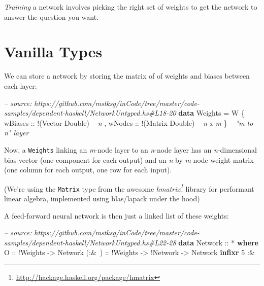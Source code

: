 \documentclass[]{article}
\newenvironment{Shaded}{}{}
\newcommand{\KeywordTok}[1]{\textcolor[rgb]{0.00,0.44,0.13}{\textbf{{#1}}}}
\newcommand{\DataTypeTok}[1]{\textcolor[rgb]{0.56,0.13,0.00}{{#1}}}
\newcommand{\DecValTok}[1]{\textcolor[rgb]{0.25,0.63,0.44}{{#1}}}
\newcommand{\CommentTok}[1]{\textcolor[rgb]{0.38,0.63,0.69}{\textit{{#1}}}}
\newcommand{\OtherTok}[1]{\textcolor[rgb]{0.00,0.44,0.13}{{#1}}}
\newcommand{\FunctionTok}[1]{\textcolor[rgb]{0.02,0.16,0.49}{{#1}}}
\newcommand{\NormalTok}[1]{{#1}}
\renewcommand{\href}[2]{#2\footnote{\url{#1}}}
\begin{document}
\emph{Training} a network involves picking the right set of weights to get the
network to answer the question you want.

\section{Vanilla Types}\label{vanilla-types}

We can store a network by storing the matrix of of weights and biases between
each layer:

\begin{Shaded}
\begin{Highlighting}[]
\CommentTok{-- source: https://github.com/mstksg/inCode/tree/master/code-samples/dependent-haskell/NetworkUntyped.hs#L18-20}
\KeywordTok{data} \DataTypeTok{Weights} \FunctionTok{=} \DataTypeTok{W} \NormalTok{\{}\OtherTok{ wBiases ::} \FunctionTok{!}\NormalTok{(}\DataTypeTok{Vector} \DataTypeTok{Double}\NormalTok{)  }\CommentTok{-- n}
                 \NormalTok{,}\OtherTok{ wNodes  ::} \FunctionTok{!}\NormalTok{(}\DataTypeTok{Matrix} \DataTypeTok{Double}\NormalTok{)  }\CommentTok{-- n x m}
                 \NormalTok{\}                              }\CommentTok{-- "m to n" layer}
\end{Highlighting}
\end{Shaded}

Now, a \texttt{Weights} linking an \emph{m}-node layer to an \emph{n}-node layer
has an \emph{n}-dimensional bias vector (one component for each output) and an
\emph{n}-by-\emph{m} node weight matrix (one column for each output, one row for
each input).

(We're using the \texttt{Matrix} type from the awesome
\emph{\href{http://hackage.haskell.org/package/hmatrix}{hmatrix}} library for
performant linear algebra, implemented using blas/lapack under the hood)

A feed-forward neural network is then just a linked list of these weights:

\begin{Shaded}
\begin{Highlighting}[]
\CommentTok{-- source: https://github.com/mstksg/inCode/tree/master/code-samples/dependent-haskell/NetworkUntyped.hs#L22-28}
\KeywordTok{data} \DataTypeTok{Network}\OtherTok{ ::} \FunctionTok{*} \KeywordTok{where}
    \DataTypeTok{O}\OtherTok{     ::} \FunctionTok{!}\DataTypeTok{Weights}
          \OtherTok{->} \DataTypeTok{Network}
\OtherTok{    (:&~) ::} \FunctionTok{!}\DataTypeTok{Weights}
          \OtherTok{->} \FunctionTok{!}\DataTypeTok{Network}
          \OtherTok{->} \DataTypeTok{Network}
\KeywordTok{infixr} \DecValTok{5} \FunctionTok{:&~}
\end{Highlighting}
\end{Shaded}
\end{document}
